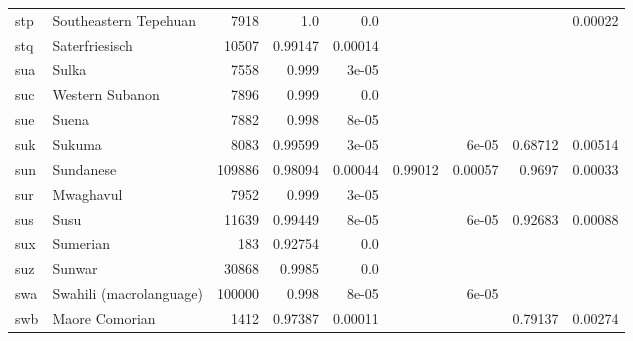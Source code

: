 \documentclass[11pt]{article}
\begin{document}
\begin{table*}[h]
{\begin{tabular}{llrrrrrrr}
stp         & Southeastern Tepehuan         & 7918         & 1.0         & 0.0         &          &          &          & 0.00022         \\

stq         & Saterfriesisch         & 10507         & 0.99147         & 0.00014         &          &          &          &          \\

sua         & Sulka         & 7558         & 0.999         & 3e-05         &          &          &          &          \\

suc         & Western Subanon         & 7896         & 0.999         & 0.0         &          &          &          &          \\

sue         & Suena         & 7882         & 0.998         & 8e-05         &          &          &          &          \\

suk         & Sukuma         & 8083         & 0.99599         & 3e-05         &          & 6e-05         & 0.68712         & 0.00514         \\

sun         & Sundanese         & 109886         & 0.98094         & 0.00044         & 0.99012         & 0.00057         & 0.9697         & 0.00033         \\

sur         & Mwaghavul         & 7952         & 0.999         & 3e-05         &          &          &          &          \\

sus         & Susu         & 11639         & 0.99449         & 8e-05         &          & 6e-05         & 0.92683         & 0.00088         \\

sux         & Sumerian         & 183         & 0.92754         & 0.0         &          &          &          &          \\

suz         & Sunwar         & 30868         & 0.9985         & 0.0         &          &          &          &          \\

swa         & Swahili (macrolanguage)         & 100000         & 0.998         & 8e-05         &          & 6e-05         &          &          \\

swb         & Maore Comorian         & 1412         & 0.97387         & 0.00011         &          &          & 0.79137         & 0.00274         \\


\end{tabular}}
\end{table*}
\end{document}
